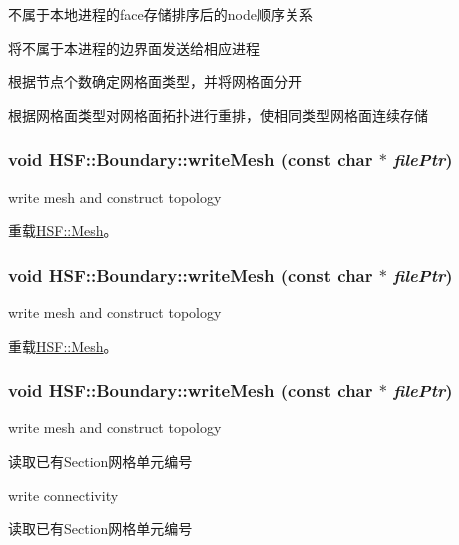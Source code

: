 不属于本地进程的face存储排序后的node顺序关系

将不属于本进程的边界面发送给相应进程

根据节点个数确定网格面类型，并将网格面分开

根据网格面类型对网格面拓扑进行重排，使相同类型网格面连续存储 \hypertarget{classHSF_1_1Boundary_aa9891dd719196ca7307e0327d1eaf39f}{
\subsubsection[{writeMesh}]{\setlength{\rightskip}{0pt plus 5cm}void HSF::Boundary::writeMesh (const char $\ast$ {\em filePtr})}}
\label{classHSF_1_1Boundary_aa9891dd719196ca7307e0327d1eaf39f}


write mesh and construct topology 

重载\hyperlink{classHSF_1_1Mesh_a2cd3b5d0f1dcf97d7b4cb565b32bcaf8}{HSF::Mesh}。\hypertarget{classHSF_1_1Boundary_aa9891dd719196ca7307e0327d1eaf39f}{
\subsubsection[{writeMesh}]{\setlength{\rightskip}{0pt plus 5cm}void HSF::Boundary::writeMesh (const char $\ast$ {\em filePtr})}}
\label{classHSF_1_1Boundary_aa9891dd719196ca7307e0327d1eaf39f}


write mesh and construct topology 

重载\hyperlink{classHSF_1_1Mesh_a2cd3b5d0f1dcf97d7b4cb565b32bcaf8}{HSF::Mesh}。\hypertarget{classHSF_1_1Boundary_aa9891dd719196ca7307e0327d1eaf39f}{
\subsubsection[{writeMesh}]{\setlength{\rightskip}{0pt plus 5cm}void HSF::Boundary::writeMesh (const char $\ast$ {\em filePtr})}}
\label{classHSF_1_1Boundary_aa9891dd719196ca7307e0327d1eaf39f}


write mesh and construct topology 

读取已有Section网格单元编号

write connectivity

读取已有Section网格单元编号

